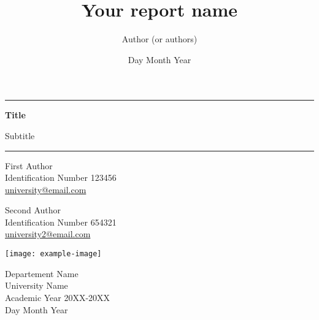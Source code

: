 \documentclass{report}
\title{Your report name}
\author{Author (or authors)}
\date{Day Month Year}
\begin{document}
\begin{titlepage}
    \centering

    \vspace*{1cm}

    \rule{\textwidth}{1pt}

    \vspace{.7\baselineskip}
    {\huge \textbf{Title}}

    \vspace*{.5cm}
    {\LARGE Subtitle}
    
    \rule{\textwidth}{1pt}

    \vspace{1cm}

    \large

    \begin{minipage}{.5\textwidth}
        \centering
        First Author \\
        Identification Number \textsc{123456} \\
        {\normalsize \url{university@email.com}}
    \end{minipage}%
    \begin{minipage}{.5\textwidth}
        \centering
        Second Author \\
        Identification Number \textsc{654321} \\
        {\normalsize \url{university2@email.com}}
    \end{minipage}


    \vspace{3cm}

    \texttt{[image: example-image]}

    \vfill

    Departement Name \\
    University Name \\
    Academic Year 20XX-20XX \\
    Day Month Year
\end{titlepage}

\end{document}
